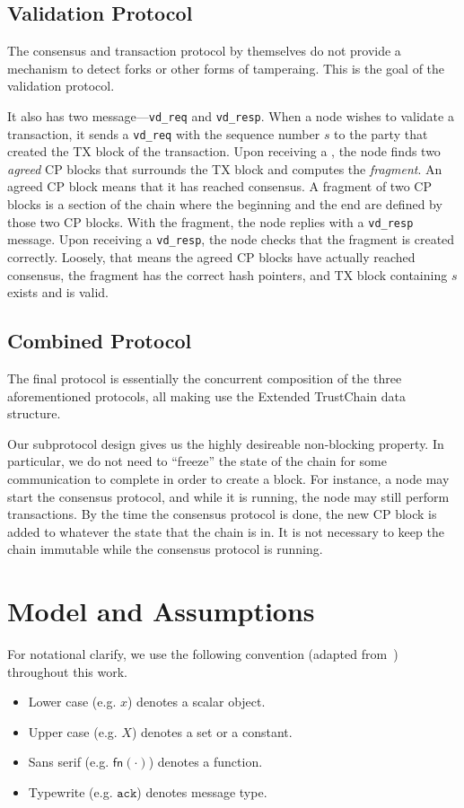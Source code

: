 \subsection{Validation Protocol}
The consensus and transaction protocol by themselves do not provide a mechanism to detect forks or other forms of tamperaing.
This is the goal of the validation protocol.

It also has two message---\texttt{vd\_req} and \texttt{vd\_resp}.
When a node wishes to validate a transaction,
it sends a \texttt{vd\_req} with the sequence number $s$ to the party that created the TX block of the transaction.
Upon receiving a , the node finds two \emph{agreed} CP blocks that surrounds the TX block and computes the \emph{fragment}.
An agreed CP block means that it has reached consensus.
A fragment of two CP blocks is a section of the chain where the beginning and the end are defined by those two CP blocks.
With the fragment, the node replies with a \texttt{vd\_resp} message.
Upon receiving a \texttt{vd\_resp}, the node checks that the fragment is created correctly.
Loosely, that means the agreed CP blocks have actually reached consensus,
the fragment has the correct hash pointers,
and TX block containing $s$ exists and is valid.


\subsection{Combined Protocol}
\label{sec:combined-protocol}
The final protocol is essentially the concurrent composition of the three aforementioned protocols,
all making use the Extended TrustChain data structure.

Our subprotocol design gives us the highly desireable non-blocking property.
In particular, we do not need to ``freeze'' the state of the chain for some communication to complete in order to create a block.
For instance, a node may start the consensus protocol, and while it is running, the node may still perform transactions.
By the time the consensus protocol is done, the new CP block is added to whatever the state that the chain is in.
It is not necessary to keep the chain immutable while the consensus protocol is running.

\section{Model and Assumptions}
\label{sec:model-assumptions}

For notational clarify, we use the following convention (adapted from~\cite{miller2016honey}) throughout this work.
\begin{itemize}
\item Lower case (e.g. $x$) denotes a scalar object.
\item Upper case (e.g. $X$) denotes a set or a constant.
\item Sans serif (e.g. $\textsf{fn}(\cdot)$) denotes a function.
\item Typewrite (e.g. $\texttt{ack}$) denotes message type.
\end{itemize}


